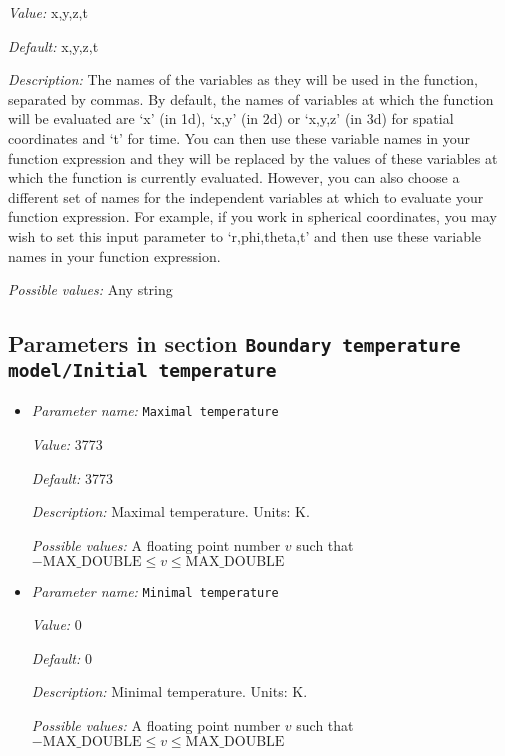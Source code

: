 \begin{itemize}
{\it Value:} x,y,z,t


{\it Default:} x,y,z,t


{\it Description:} The names of the variables as they will be used in the function, separated by commas. By default, the names of variables at which the function will be evaluated are `x' (in 1d), `x,y' (in 2d) or `x,y,z' (in 3d) for spatial coordinates and `t' for time. You can then use these variable names in your function expression and they will be replaced by the values of these variables at which the function is currently evaluated. However, you can also choose a different set of names for the independent variables at which to evaluate your function expression. For example, if you work in spherical coordinates, you may wish to set this input parameter to `r,phi,theta,t' and then use these variable names in your function expression.


{\it Possible values:} Any string
\end{itemize}

\subsection{Parameters in section \tt Boundary temperature model/Initial temperature}
\label{parameters:Boundary_20temperature_20model/Initial_20temperature}

\begin{itemize}
\item {\it Parameter name:} {\tt Maximal temperature}
\label{parameters:Boundary temperature model/Initial temperature/Maximal temperature}
\label{parameters:Boundary_20temperature_20model/Initial_20temperature/Maximal_20temperature}


{\it Value:} 3773


{\it Default:} 3773


{\it Description:} Maximal temperature. Units: K.


{\it Possible values:} A floating point number $v$ such that $-\text{MAX\_DOUBLE} \leq v \leq \text{MAX\_DOUBLE}$
\item {\it Parameter name:} {\tt Minimal temperature}
\label{parameters:Boundary temperature model/Initial temperature/Minimal temperature}
\label{parameters:Boundary_20temperature_20model/Initial_20temperature/Minimal_20temperature}


{\it Value:} 0


{\it Default:} 0


{\it Description:} Minimal temperature. Units: K.


{\it Possible values:} A floating point number $v$ such that $-\text{MAX\_DOUBLE} \leq v \leq \text{MAX\_DOUBLE}$
\end{itemize}

